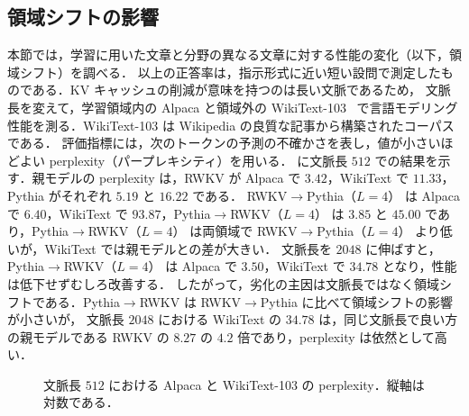 \documentclass[techrep,noauthor]{ipsj}
\newcommand{\revr}[1]{{\color{red}#1}}
\newcommand{\revp}[1]{{\color{violet}#1}}
\newcommand{\RtoP}{\textsf{RWKV$\to$\allowbreak Pythia}}
\newcommand{\PtoR}{\textsf{Pythia$\to$\allowbreak RWKV}}
\newcommand{\RtoPL}[1]{\RtoP{}（$L{=}#1$）}
\newcommand{\PtoRL}[1]{\PtoR{}（$L{=}#1$）}
\begin{document}
\subsection{\revr{領域シフトの影響}}\label{sec:domain}
\revr{本節では，学習に用いた文章と分野の異なる文章に対する性能の変化（以下，領域シフト）を調べる．
以上の正答率は，指示形式に近い短い設問で測定したものである．KV キャッシュの削減が意味を持つのは長い文脈であるため，
文脈長を変えて，学習領域内の Alpaca と領域外の WikiText-103~\cite{merity2017pointer} で言語モデリング性能を測る．WikiText-103 は Wikipedia の良質な記事から構築されたコーパスである．
評価指標には，次のトークンの予測の不確かさを表し，値が小さいほどよい perplexity（パープレキシティ）を用いる．
\figref{fig:domain} に文脈長 $512$ での結果を示す．親モデルの perplexity は，RWKV が Alpaca で $3.42$，WikiText で $11.33$，Pythia がそれぞれ $5.19$ と $16.22$ である．
\RtoPL{4} は Alpaca で $6.40$，WikiText で $93.87$，\PtoRL{4} は $3.85$ と $45.00$ であり，\PtoRL{4} は両領域で \RtoPL{4} より低いが，WikiText では親モデルとの差が大きい．
文脈長を $2048$ に伸ばすと，\PtoRL{4} は Alpaca で $3.50$，WikiText で $34.78$ となり，性能は低下せずむしろ改善する．
したがって，劣化の主因は文脈長ではなく領域シフトである．\PtoR{} は \RtoP{} に比べて領域シフトの影響が小さいが，
文脈長 $2048$ における WikiText の $34.78$ は，同じ文脈長で良い方の親モデルである RWKV の $8.27$ の $4.2$ 倍であり，perplexity は依然として高い．}

\begin{figure}[!htb]\centering
{}
\caption{\revp{文脈長} $512$ における Alpaca と WikiText-103 の perplexity．縦軸は対数である．}
\label{fig:domain}
\end{figure}
\end{document}
